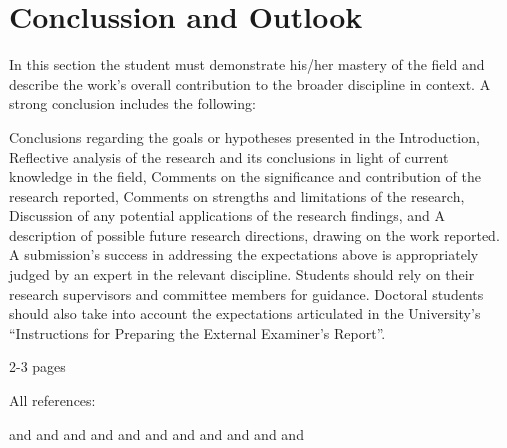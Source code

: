 \chapter{Conclussion and Outlook} \label{chap:conclussion}

In this section the student must demonstrate his/her mastery of the field and describe the work's overall contribution to the broader discipline in context. A strong conclusion includes the following:

Conclusions regarding the goals or hypotheses presented in the Introduction,
Reflective analysis of the research and its conclusions in light of current knowledge in the field,
Comments on the significance and contribution of the research reported,
Comments on strengths and limitations of the research,
Discussion of any potential applications of the research findings, and
A description of possible future research directions, drawing on the work reported.
A submission's success in addressing the expectations above is appropriately judged by an expert in the relevant discipline. Students should rely on their research supervisors and committee members for guidance. Doctoral students should also take into account the expectations articulated in the University's “Instructions for Preparing the External Examiner's Report”.

2-3 pages

All references:

\citep{article:01:visual} and \citep{article:02:laser} and \citep{article:03:motorsignals} and \citep{article:04:onlinelearning} and \citep{thesis:05:proprioception} and \citep{article:06:haptic} and \citep{thesis:07:proprioception} and \citep{article:08:rhex} and \citep{article:09:roughterrain} and \citep{article:10:pruningalgs} and \citep{book:11:scorpion} and \citep{thesis:12:gaitcontrol}